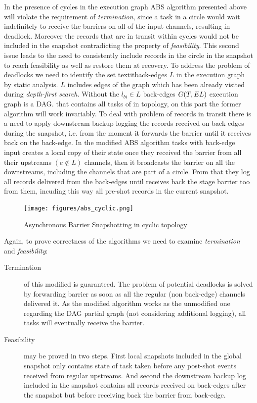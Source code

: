 \cite{abs}
In the presence of cycles in the execution graph ABS algorithm presented above will violate the requirement of \textit{termination}, since a task in a circle would wait indefinitely to receive the barriers on all of the input channels, resulting in deadlock. Moreover the records that are in transit within cycles would not be included in the snapshot contradicting the property of \textit{feasibility}. This second issue leads to the need to consistently include records in the circle in the snapshot to reach feasibility as well as restore them at recovery.
To address the problem of deadlocks we need to identify the set textit{back-edges} $L$  in the execution graph by static analysis. $L$ includes edges of the graph which has been already visited during \textit{depth-first search}. Without the $l_{bi} \in L$ back-edges $G(T, E\\L)$ execution graph is a DAG. that contains all tasks of in topology, on this part the former algorithm will work invariably. To deal with problem of records in transit there is a need to apply downstream backup logging the records received on back-edges during the snapshot, i.e. from the moment it forwards the barrier until it receives back on the back-edge.      
In the modified ABS algorithm  tasks with back-edge input creates a local copy of their state once they received the barrier from all their upstreams $(e \notin L)$ channels, then it broadcasts the barrier on all the downstreams, including the channels that are part of a circle. From that they log all records delivered from the back-edges until receives back the stage barrier too from them, incuding this way all pre-shot records in the current snapshot.  
\begin{figure}[!ht]
  \centering    
      \texttt{[image: figures/abs\_cyclic.png]}
  \caption{Asynchronous Barrier Snapshotting in cyclic topology\cite{abs}}
  \label{fig:abs_cyclic}
\end{figure}
Again, to prove correctness of the algorithms we need to examine \textit{termination} and \textit{feasibility}:
\begin{description}

\item[Termination] of this modified is guaranteed. The problem of potential deadlocks is solved by forwarding barrier as soon as all the regular (non back-edge) channels delivered it. As the modified algorithm works as the unmodified one regarding the DAG partial graph (not considering additional logging), all tasks will eventually receive the barrier.
\item[Feasibility] may be proved in two steps. First local snapshots included in the global snapshot only contains state of task taken before any post-shot events received from regular upstreams. And second the downstream backup log included in the snapshot contains all records received on back-edges after the snapshot but before receiving back the barrier from back-edge.
\end{description} 
